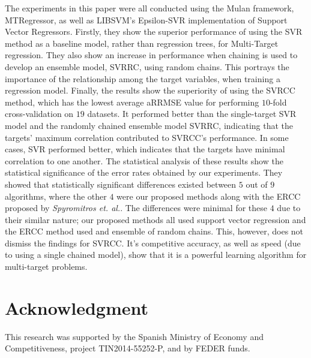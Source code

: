 \documentclass[preprint,12pt]{elsarticle}
\begin{document}
The experiments in this paper were all conducted using the Mulan framework, MTRegressor, as well as LIBSVM's Epsilon-SVR implementation of Support Vector Regressors. Firstly, they show the superior performance of using the SVR method as a baseline model, rather than regression trees, for Multi-Target regression. They also show an increase in performance when chaining is used to develop an ensemble model, SVRRC, using random chains. This portrays the importance of the relationship among the target variables, when training a regression model. Finally, the results show the superiority of using the SVRCC method, which has the lowest average aRRMSE value for performing $10$-fold cross-validation on $19$ datasets. It performed better than the single-target SVR model and the randomly chained ensemble model SVRRC, indicating that the targets' maximum correlation contributed to SVRCC's performance. In some cases, SVR performed better, which indicates that the targets have minimal correlation to one another. The statistical analysis of these results show the statistical significance of the error rates obtained by our experiments. They showed that statistically significant differences existed between $5$ out of $9$ algorithms, where the other $4$ were our proposed methods along with the ERCC proposed by \textit{Spyromitros et. al.}. The differences were minimal for these $4$ due to their similar nature; our proposed methods all used support vector regression and the ERCC method used and ensemble of random chains. This, however, does not dismiss the findings for SVRCC. It's competitive accuracy, as well as speed (due to using a single chained model), show that it is a powerful learning algorithm for multi-target problems. 

\section*{Acknowledgment}

This research was supported by the Spanish Ministry of Economy and Competitiveness, project TIN2014-55252-P, and by FEDER funds.



\end{document}
